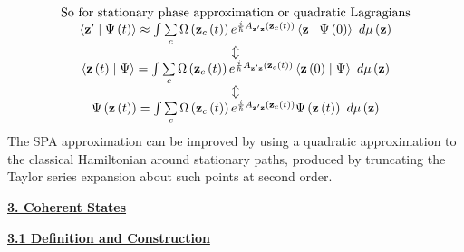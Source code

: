 \documentclass{amsart}
\begin{document}
\[
\begin{array}{c}
 \mbox{So for stationary phase approximation or quadratic Lagragians} \\
 \left\langle {{\rm {\bf {z}'}}} \mathrel{\left| {\vphantom {{{\rm {\bf
{z}'}}} {\Psi \left( t \right)}}} \right. \kern-\nulldelimiterspace} {\Psi
\left( t \right)} \right\rangle \approx \int {\sum\limits_c {\Omega \left(
{{\rm {\bf z}}_c \left( t \right)} \right)e^{\frac{i}{\hbar }A_{{\rm {\bf
{z}'z}}} \left( {{\rm {\bf z}}_c (t)} \right)}} } \left\langle {{\rm {\bf
z}}} \mathrel{\left| {\vphantom {{\rm {\bf z}} {\Psi \left( 0 \right)}}}
\right. \kern-\nulldelimiterspace} {\Psi \left( 0 \right)} \right\rangle
\mbox{ }d\mu \left( {\rm {\bf z}} \right) \\
 \Updownarrow \\
 \left\langle {{\rm {\bf z}}\left( t \right)} \mathrel{\left| {\vphantom
{{{\rm {\bf z}}\left( t \right)} \Psi }} \right. \kern-\nulldelimiterspace}
{\Psi } \right\rangle =\int {\sum\limits_c {\Omega \left( {{\rm {\bf z}}_c
\left( t \right)} \right)e^{\frac{i}{\hbar }A_{{\rm {\bf {z}'z}}} \left(
{{\rm {\bf z}}_c (t)} \right)}} } \left\langle {{\rm {\bf z}}\left( 0
\right)} \mathrel{\left| {\vphantom {{{\rm {\bf z}}\left( 0 \right)} \Psi }}
\right. \kern-\nulldelimiterspace} {\Psi } \right\rangle \mbox{ }d\mu \left(
{\rm {\bf z}} \right) \\
 \Updownarrow \\
 \Psi \left( {{\rm {\bf z}}\left( t \right)} \right)=\int {\sum\limits_c
{\Omega \left( {{\rm {\bf z}}_c \left( t \right)} \right)e^{\frac{i}{\hbar
}A_{{\rm {\bf {z}'z}}} \left( {{\rm {\bf z}}_c (t)} \right)}} } \Psi \left(
{{\rm {\bf z}}\left( t \right)} \right)\mbox{ }d\mu \left( {\rm {\bf z}}
\right) \\
 \end{array}
\]
The SPA approximation can be improved by using a quadratic approximation to
the classical Hamiltonian around stationary paths, produced by truncating
the Taylor series expansion about such points at second order.

\underline {\textbf{3. Coherent States}}

\underline {\textbf{3.1 Definition and Construction}}
\end{document}
